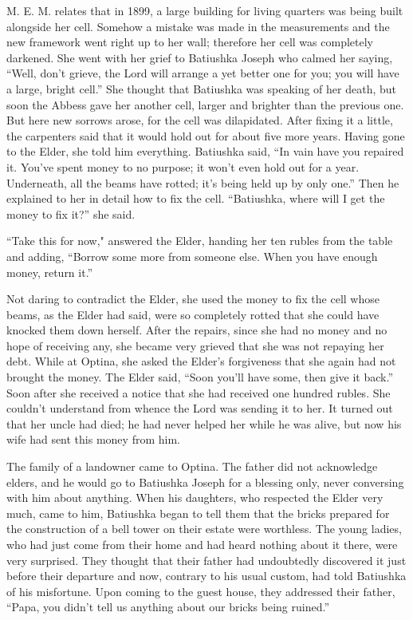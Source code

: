 M. E. M. relates that in 1899, a large building for living quarters was being built alongside her cell. Somehow a mistake was made in the measurements and the new framework went right up to her wall; therefore her cell was completely darkened. She went with her grief to Batiushka Joseph who calmed her saying, “Well, don't grieve, the Lord will arrange a yet better one for you; you will have a large, bright cell.” She thought that Batiushka was speaking of her death, but soon the Abbess gave her another cell, larger and brighter than the previous one. But here new sorrows arose, for the cell was dilapidated. After fixing it a little, the carpenters said that it would hold out for about five more years. Having gone to the Elder, she told him everything. Batiushka said, “In vain have you repaired it. You've spent money to no purpose; it won't even hold out for a year. Underneath, all the beams have rotted; it's being held up by only one.” Then he explained to her in detail how to fix the cell. “Batiushka, where will I get the money to fix it?” she said.

“Take this for now," answered the Elder, handing her ten rubles from the table and adding, “Borrow some more from someone else. When you have enough money, return it.”

Not daring to contradict the Elder, she used the money to fix the cell whose beams, as the Elder had said, were so completely rotted that she could have knocked them down herself. After the repairs, since she had no money and no hope of receiving any, she became very grieved that she was not repaying her debt. While at Optina, she asked the Elder's forgiveness that she again had not brought the money. The Elder said, “Soon you'll have some, then give it back.” Soon after she received a notice that she had received one hundred rubles. She couldn't understand from whence the Lord was sending it to her. It turned out that her uncle had died; he had never helped her while he was alive, but now his wife had sent this money from him.

The family of a landowner came to Optina. The father did not acknowledge elders, and he would go to Batiushka Joseph for a blessing only, never conversing with him about anything. When his daughters, who respected the Elder very much, came to him, Batiushka began to tell them that the bricks prepared for the construction of a bell tower on their estate were worthless. The young ladies, who had just come from their home and had heard nothing about it there, were very surprised. They thought that their father had undoubtedly discovered it just before their departure and now, contrary to his usual custom, had told Batiushka of his misfortune. Upon coming to the guest house, they addressed their father, “Papa, you didn't tell us anything about our bricks being ruined.”

